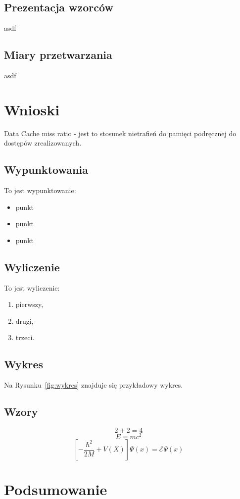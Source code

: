 \documentclass{article}
\begin{document}
\subsection{Prezentacja wzorców}
asdf
\subsection{Miary przetwarzania}
asdf

\section{Wnioski}
Data Cache miss ratio - jest to stosunek nietrafień do pamięci podręcznej do dostępów zrealizowanych.


\subsection{Wypunktowania}
To jest wypunktowanie:
\begin{itemize}
\item punkt
\item punkt
\item punkt
\end{itemize}
\subsection{Wyliczenie}
To jest wyliczenie:
\begin{enumerate}
\item pierwszy,
\item drugi,
\item trzeci.
\end{enumerate}
\subsection{Wykres}
Na Rysunku~\ref{fig:wykres} znajduje się przykładowy wykres.
\subsection{Wzory}
\begin{equation}
2 + 2 = 4
\end{equation}
\begin{equation}
E = mc^2
\end{equation}
\begin{equation}
\left[- \frac{\hbar^2}{2M} + V(X) \right] \Psi(x)=  \mathcal{E} \Psi(x)
\end{equation}

\section{Podsumowanie}
\end{document}
